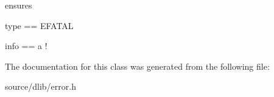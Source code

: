 \label{classdlib_1_1fatal__error_ad824e88fda1a7e4e0fad7b147730dcfc}
ensures
\begin{DoxyItemize}
\item type == EFATAL
\item info == a ! 
\end{DoxyItemize}

The documentation for this class was generated from the following file:\begin{DoxyCompactItemize}
\item 
source/dlib/error.h\end{DoxyCompactItemize}
